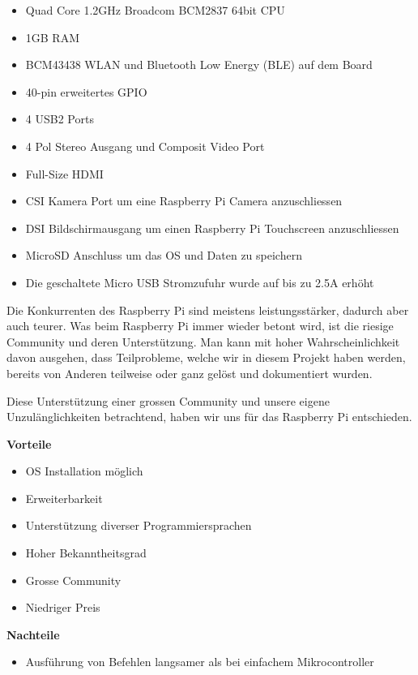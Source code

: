 \documentclass[a4paper]{report}
\begin{document}
\begin{itemize}[noitemsep]
	\item Quad Core 1.2GHz Broadcom BCM2837 64bit CPU
	\item 1GB RAM
	\item BCM43438 WLAN und Bluetooth Low Energy (BLE) auf dem Board
	\item 40-pin erweitertes GPIO
	\item 4 USB2 Ports
	\item 4 Pol Stereo Ausgang und Composit Video Port
	\item Full-Size HDMI
	\item CSI Kamera Port um eine Raspberry Pi Camera anzuschliessen
	\item DSI Bildschirmausgang um einen Raspberry Pi Touchscreen anzuschliessen
	\item MicroSD Anschluss um das OS und Daten zu speichern
	\item Die geschaltete Micro USB Stromzufuhr wurde auf bis zu 2.5A erhöht
\end{itemize}

Die Konkurrenten des Raspberry Pi sind meistens leistungsstärker, dadurch aber auch teurer. Was beim Raspberry Pi immer wieder betont wird, ist die riesige Community und deren Unterstützung. Man kann mit hoher Wahrscheinlichkeit davon ausgehen, dass Teilprobleme, welche wir in diesem Projekt haben werden, bereits von Anderen teilweise oder ganz gelöst und dokumentiert wurden.

Diese Unterstützung einer grossen Community und unsere eigene Unzulänglichkeiten betrachtend, haben wir uns für das Raspberry Pi entschieden.

\begin{multicols}{2}
	\textbf{Vorteile}
	\begin{itemize}[label={+},noitemsep]
		\item OS Installation möglich
		\item Erweiterbarkeit
		\item Unterstützung diverser Programmiersprachen
		\item Hoher Bekanntheitsgrad
		\item Grosse Community
		\item Niedriger Preis
	\end{itemize}
	\columnbreak
	\textbf{Nachteile}
	\begin{itemize}[label={-},noitemsep]
		\item Ausführung von Befehlen langsamer als bei einfachem Mikrocontroller
	\end{itemize}
\end{multicols}
\end{document}
